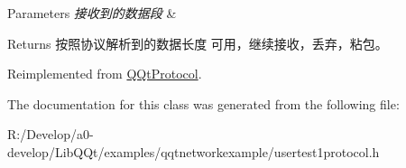 \begin{DoxyParams}{Parameters}
{\em 接收到的数据段} & \\
\hline
\end{DoxyParams}
\begin{DoxyReturn}{Returns}
按照协议解析到的数据长度 可用，继续接收，丢弃，粘包。 
\end{DoxyReturn}


Reimplemented from \mbox{\hyperlink{class_q_qt_protocol_a00fd0c1ac23379ed3b9b25da9a34f39b}{Q\+Qt\+Protocol}}.



The documentation for this class was generated from the following file\+:\begin{DoxyCompactItemize}
\item 
R\+:/\+Develop/a0-\/develop/\+Lib\+Q\+Qt/examples/qqtnetworkexample/usertest1protocol.\+h\end{DoxyCompactItemize}
